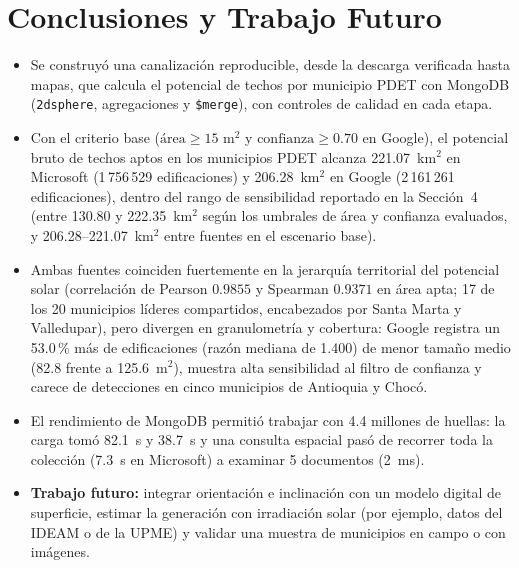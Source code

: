 \section{Conclusiones y Trabajo Futuro}
\begin{itemize}
  \item Se construyó una canalización reproducible, desde la descarga verificada hasta mapas, que calcula el potencial de techos por municipio PDET con MongoDB (\texttt{2dsphere}, agregaciones y \texttt{\$merge}), con controles de calidad en cada etapa.
  \item Con el criterio base ($\text{área} \geq 15\text{~m}^2$ y $\text{confianza} \geq 0.70$ en Google), el potencial bruto de techos aptos en los municipios PDET alcanza 221.07~km$^2$ en Microsoft (1\,756\,529 edificaciones) y 206.28~km$^2$ en Google (2\,161\,261 edificaciones), dentro del rango de sensibilidad reportado en la Sección~4 (entre 130.80 y 222.35~km$^2$ según los umbrales de área y confianza evaluados, y 206.28--221.07~km$^2$ entre fuentes en el escenario base).
  \item Ambas fuentes coinciden fuertemente en la jerarquía territorial del potencial solar (correlación de Pearson $0.9855$ y Spearman $0.9371$ en área apta; 17 de los 20 municipios líderes compartidos, encabezados por Santa Marta y Valledupar), pero divergen en granulometría y cobertura: Google registra un 53.0\,\% más de edificaciones (razón mediana de 1.400) de menor tamaño medio (82.8 frente a 125.6~m$^2$), muestra alta sensibilidad al filtro de confianza y carece de detecciones en cinco municipios de Antioquia y Chocó.
  \item El rendimiento de MongoDB permitió trabajar con 4.4 millones de huellas: la carga tomó 82.1~s y 38.7~s y una consulta espacial pasó de recorrer toda la colección (7.3~s en Microsoft) a examinar 5 documentos (2~ms).
  \item \textbf{Trabajo futuro:} integrar orientación e inclinación con un modelo digital de superficie, estimar la generación con irradiación solar (por ejemplo, datos del IDEAM o de la UPME) y validar una muestra de municipios en campo o con imágenes.
\end{itemize}
